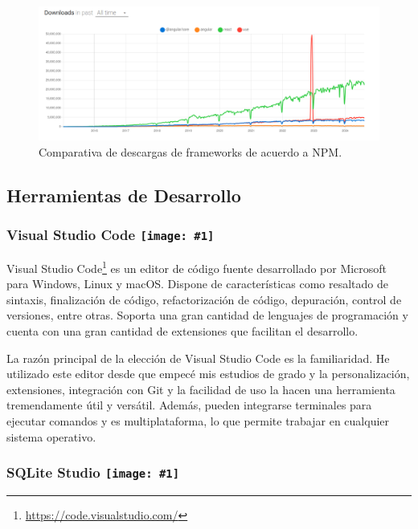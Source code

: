 \begin{figure}[H]
    \centering
    \includegraphics[width=1\textwidth]{./imagenes/Comparativa.png}
    \caption{Comparativa de descargas de frameworks de acuerdo a NPM.}
\end{figure}

\newpage

\subsection{Herramientas de Desarrollo}

\newcommand{\icon}[1]{\texttt{[image: \#1]}}
\subsubsection*{Visual Studio Code \protect\icon{./imagenes/vscode_logo.png}}

Visual Studio Code\footnote{\url{https://code.visualstudio.com/}} es un editor de código fuente desarrollado por Microsoft para Windows, Linux y macOS. Dispone de características como resaltado de sintaxis, finalización de código, refactorización de código, depuración, control de versiones, entre otras. Soporta una gran cantidad de lenguajes de programación y cuenta con una gran cantidad de extensiones que facilitan el desarrollo. \newline

La razón principal de la elección de Visual Studio Code es la familiaridad. He utilizado este editor desde que empecé mis estudios de grado y la personalización, extensiones, integración con Git y la facilidad de uso la hacen una herramienta tremendamente útil y versátil. Además, pueden integrarse terminales para ejecutar comandos y es multiplataforma, lo que permite trabajar en cualquier sistema operativo.\newline

\renewcommand{\icon}[1]{\texttt{[image: \#1]}}
\subsubsection*{SQLite Studio \protect\icon{./imagenes/sqlite_logo.png}}


